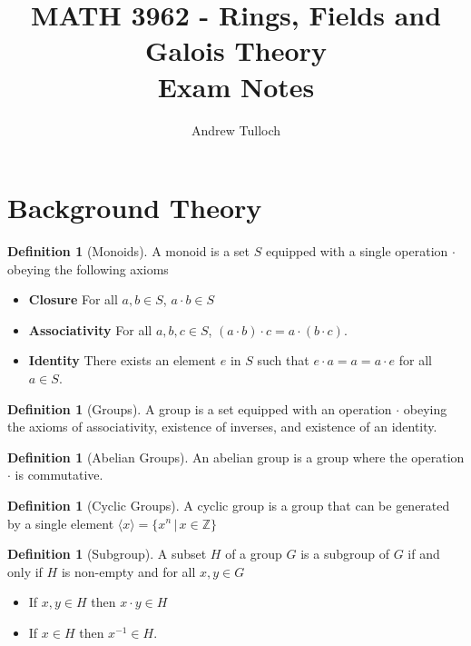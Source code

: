 \documentclass[10pt, oneside, reqno]{amsart}
\title{MATH 3962 - Rings, Fields and Galois Theory \\ Exam Notes}								%
\author{Andrew Tulloch}
\theoremstyle{plain}%
\theoremstyle{definition}
\newtheorem{defn}[thm]{Definition}
\theoremstyle{remark}
\begin{document}
\maketitle

\section{Background Theory} %
\label{cha:background_theory}

\begin{defn}[Monoids]
	A monoid is a set $S$ equipped with a single operation $\cdot$ obeying the following axioms
	\begin{itemize}
		\item \textbf{Closure} For all $a,b \in S$, $a \cdot b \in S$ 
		\item \textbf{Associativity} For all $a,b,c \in S$, $(a \cdot b) \cdot c = a \cdot (b \cdot c)$.
		\item \textbf{Identity}  There exists an element $e$ in $S$ such that $e \cdot a = a = a \cdot e$ for all $a \in S$. 
	\end{itemize}
	
\end{defn}

\begin{defn}[Groups]
	A group is a set equipped with an operation $\cdot$ obeying the axioms of associativity, existence of inverses, and existence of an identity.
\end{defn}

\begin{defn}[Abelian Groups]
	An abelian group is a group where the operation $\cdot$ is commutative.
\end{defn}

\begin{defn}[Cyclic Groups]
	A cyclic group is a group that can be generated by a single element $\langle x \rangle = \{ x^n \, | \, x \in \mathbb{Z}\}$
\end{defn}

\begin{defn}[Subgroup]
	A subset $H$ of a group $G$ is a subgroup of $G$ if and only if $H$ is non-empty and for all $x,y \in G$ 
	\begin{itemize}
		\item If $x,y \in H$ then $x \cdot y \in H$ 
		\item If $x \in H$ then $x^{-1} \in H$.
	\end{itemize}
\end{defn}
\end{document}

